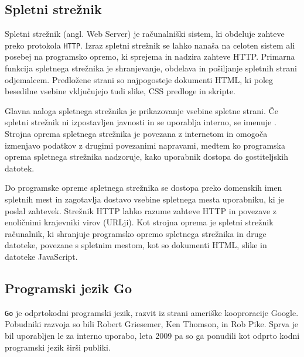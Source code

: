 \documentclass[a4paper, 12pt]{book}
\begin{document}
\subsection{Spletni strežnik}

Spletni strežnik (angl. Web Server) je računalniški sistem, ki obdeluje zahteve preko protokola \verb=HTTP=. Izraz spletni strežnik se lahko nanaša na celoten sistem ali posebej na programsko opremo, ki sprejema in nadzira zahteve HTTP. Primarna funkcija spletnega strežnika je shranjevanje, obdelava in pošiljanje spletnih strani odjemalcem. Predložene strani so najpogosteje dokumenti HTML, ki poleg besedilne vsebine vključujejo tudi slike, CSS predloge in skripte. 

Glavna naloga spletnega strežnika je prikazovanje vsebine spletne strani. Če spletni strežnik ni izpostavljen javnosti in se uporablja interno, se imenuje . Strojna oprema spletnega strežnika je povezana z internetom in omogoča izmenjavo podatkov z drugimi povezanimi napravami, medtem ko programska oprema spletnega strežnika nadzoruje, kako uporabnik dostopa do gostiteljskih datotek.

Do programske opreme spletnega strežnika se dostopa preko domenskih imen spletnih mest in zagotavlja dostavo vsebine spletnega mesta uporabniku, ki je poslal zahtevek. Strežnik HTTP lahko razume zahteve HTTP in povezave z enoličnimi krajevniki  virov (URLji). Kot strojna oprema je spletni strežnik računalnik, ki shranjuje programsko opremo spletnega strežnika in druge datoteke, povezane s spletnim mestom, kot so dokumenti HTML, slike in datoteke JavaScript.



\subsection{Programski jezik Go}

\verb=Go= je odprtokodni programski jezik, razvit iz strani ameriške kooproracije Google. Pobudniki razvoja so bili Robert Griesemer, Ken Thomson, in Rob Pike. Sprva je bil uporabljen le za interno uporabo, leta 2009 pa so ga ponudili kot odprto kodni programski jezik širši publiki. 
 
\end{document}
